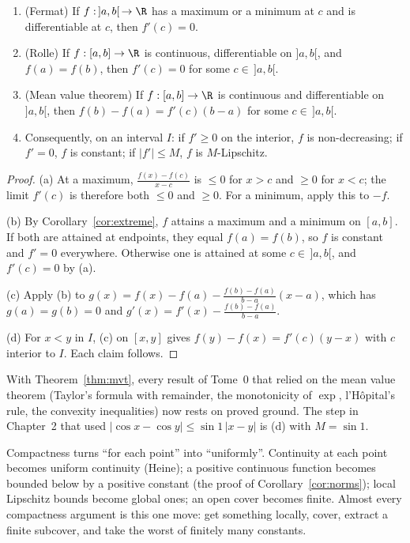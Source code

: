 \begin{theorem}\label{thm:mvt}
\begin{enumerate}[label=(\alph*)]
\item (Fermat) If $f:\,]a,b[\,\to\R$ has a maximum or a minimum at $c$ and is differentiable at $c$, then $f'(c)=0$.
\item (Rolle) If $f:[a,b]\to\R$ is continuous, differentiable on $]a,b[$, and $f(a)=f(b)$, then $f'(c)=0$ for some $c\in\,]a,b[$.
\item (Mean value theorem) If $f:[a,b]\to\R$ is continuous and differentiable on $]a,b[$, then $f(b)-f(a)=f'(c)(b-a)$ for some $c\in\,]a,b[$.
\item Consequently, on an interval $I$: if $f'\ge0$ on the interior, $f$ is non-decreasing; if $f'=0$, $f$ is constant; if $|f'|\le M$, $f$ is $M$-Lipschitz.
\end{enumerate}
\end{theorem}
\begin{proof}
(a) At a maximum, $\frac{f(x)-f(c)}{x-c}$ is $\le0$ for $x>c$ and $\ge0$ for $x<c$; the limit $f'(c)$ is therefore both $\le0$ and $\ge0$. For a minimum, apply this to $-f$.

(b) By Corollary~\ref{cor:extreme}, $f$ attains a maximum and a minimum on $[a,b]$. If both are attained at endpoints, they equal $f(a)=f(b)$, so $f$ is constant and
$f'=0$ everywhere. Otherwise one is attained at some $c\in\,]a,b[$, and $f'(c)=0$ by (a).

(c) Apply (b) to $g(x)=f(x)-f(a)-\frac{f(b)-f(a)}{b-a}(x-a)$, which has $g(a)=g(b)=0$ and $g'(x)=f'(x)-\frac{f(b)-f(a)}{b-a}$.

(d) For $x<y$ in $I$, (c) on $[x,y]$ gives $f(y)-f(x)=f'(c)(y-x)$ with $c$ interior to $I$. Each claim follows.
\end{proof}

With Theorem~\ref{thm:mvt}, every result of Tome~0 that relied on the mean value theorem (Taylor's formula with remainder, the
monotonicity of $\exp$, l'H\^opital's rule, the convexity inequalities) now rests on proved ground. The step in
Chapter~2 that used $|\cos x-\cos y|\le\sin1\,|x-y|$ is (d) with $M=\sin1$.

\begin{beauty}
Compactness turns ``for each point'' into ``uniformly''. Continuity at each point becomes uniform continuity (Heine); a positive
continuous function becomes bounded below by a positive constant (the proof of Corollary~\ref{cor:norms}); local Lipschitz bounds become global
ones; an open cover becomes finite. Almost every compactness argument is this one move: get something locally, cover,
extract a finite subcover, and take the worst of finitely many constants.
\end{beauty}

